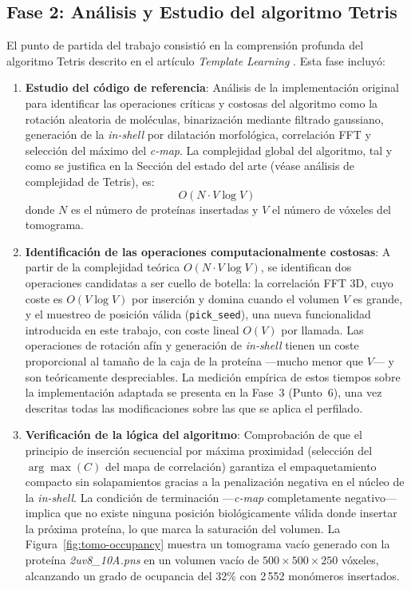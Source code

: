 \subsection{Fase 2: Análisis y Estudio del algoritmo Tetris}

El punto de partida del trabajo consistió en la comprensión profunda del algoritmo Tetris descrito en el artículo \textit{Template Learning} \cite{harastani2025template}. Esta fase incluyó:

\begin{enumerate}
    \item \textbf{Estudio del código de referencia}: Análisis de la implementación original para identificar las operaciones críticas y costosas del algoritmo como la rotación aleatoria de moléculas, binarización mediante filtrado gaussiano, generación de la \textit{in-shell} por dilatación morfológica, correlación FFT y selección del máximo del \textit{c-map}. La complejidad global del algoritmo, tal y como se justifica en la Sección del estado del arte (véase análisis de complejidad de Tetris), es:
    \begin{equation}
        O(N \cdot V \log V)
    \end{equation}
    donde $N$ es el número de proteínas insertadas y $V$ el número de vóxeles del tomograma. 

    \item \textbf{Identificación de las operaciones computacionalmente costosas}: A partir de la complejidad teórica $O(N \cdot V \log V)$, se identifican dos operaciones candidatas a ser cuello de botella: la correlación FFT 3D, cuyo coste es $O(V \log V)$ por inserción y domina cuando el volumen $V$ es grande, y el muestreo de posición válida (\texttt{pick\_seed}), una nueva funcionalidad introducida en este trabajo, con coste lineal $O(V)$ por llamada. Las operaciones de rotación afín y generación de \textit{in-shell} tienen un coste proporcional al tamaño de la caja de la proteína —mucho menor que $V$— y son teóricamente despreciables. La medición empírica de estos tiempos sobre la implementación adaptada se presenta en la Fase~3 (Punto~6), una vez descritas todas las modificaciones sobre las que se aplica el perfilado.

    \item \textbf{Verificación de la lógica del algoritmo}: Comprobación de que el principio de inserción secuencial por máxima proximidad (selección del $\arg\max(C)$ del mapa de correlación) garantiza el empaquetamiento compacto sin solapamientos gracias a la penalización negativa en el núcleo de la \textit{in-shell}. La condición de terminación —\textit{c-map} completamente negativo— implica que no existe ninguna posición biológicamente válida donde insertar la próxima proteína, lo que marca la saturación del volumen. La Figura~\ref{fig:tomo-occupancy} muestra un tomograma vacío generado con la proteína \textit{2uv8\_10A.pns} en un volumen vacío de $500\times500\times250$ vóxeles, alcanzando un grado de ocupancia del 32\% con 2\,552 monómeros insertados.


\end{enumerate}
